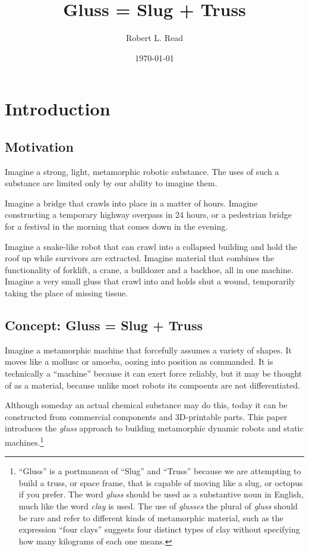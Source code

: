 \documentclass[12pt]{article}
\title{Gluss = Slug + Truss}
\author{Robert L. Read}
\date{\today}
\begin{document}
\maketitle


\tableofcontents

\section{Introduction}

\subsection{Motivation}

Imagine a strong, light, metamorphic robotic substance.
The uses of such a substance are limited only by our ability to imagine them.

Imagine a bridge that crawls into place in a matter of hours.
Imagine constructing a temporary highway overpass in 24 hours, or a pedestrian bridge for a festival
in the morning that comes down in the evening.

Imagine a snake-like robot that can crawl into a collapsed building and hold the roof up
while survivors are extracted.
Imagine material that combines the functionality of forklift, a crane, a bulldozer and a backhoe,
all in one machine. Imagine a very small gluss that crawl into and holds shut a wound,
temporarily taking the place of missing tissue.

\subsection{Concept: Gluss = Slug + Truss}

Imagine a metamorphic machine that forcefully assumes a variety of shapes. It moves like a mollusc or amoeba,
oozing into position as commanded. It is technically a ``machine'' because it can exert force reliably, but
it may be thought of as a material, because unlike most robots its compoents are not differentiated.

Although someday an actual chemical substance may do this, today it can be constructed from commercial components
and 3D-printable parts. This paper introduces the \emph{gluss} approach to building metamorphic dynamic robots
and static machines.\footnote{ ``Gluss'' is a portmaneau of ``Slug'' and ``Truss'' because we are attempting to
build a truss, or space frame, that is capable of moving like a slug, or octopus if you prefer.
The word \textit{gluss}
should be used as a substantive noun in English, much like the word \textit{clay} is used.
The use of \textit{glusses} the plural
of \textit{gluss} should be rare and refer to different kinds of metamorphic material, such as the expression
``four clays'' suggests four distinct types of clay without specifying how many kilograms of each one means.}
\end{document}
